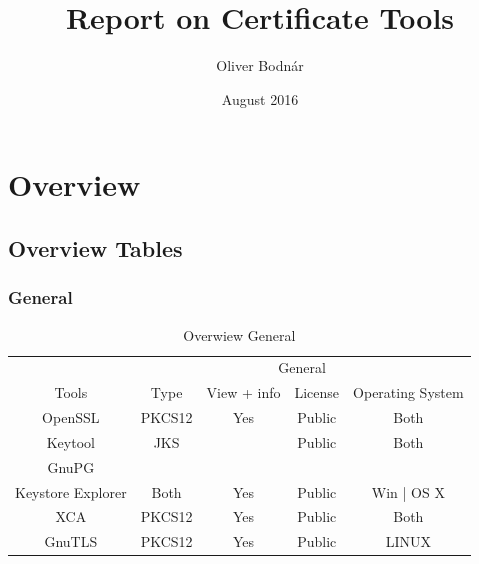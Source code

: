 \documentclass[10pt, a4paper]{report}
\title{Report on Certificate Tools}
\author{Oliver Bodnár}
\date{August 2016}
\begin{document}
\maketitle

\tableofcontents

\newpage

\part{Overview}

\chapter{Overview Tables}

\section{General}
\begin{table}[h!]
\centering
\caption{Overwiew General}
\label{my-label}
\begin{adjustbox}{max width=\textwidth}
\begin{tabular}{|c|c|c|c|c|}
\hline
                        & \multicolumn{4}{c|}{General}                                                                               \\ \cline{2-5} 
\multirow{-2}{*}{Tools} & Type   & View + info                                        & License & Operating System                   \\ \hline
OpenSSL                 & PKCS12 & \cellcolor[HTML]{34FF34}Yes                        & Public  & \cellcolor[HTML]{34FF34}Both       \\ \hline
Keytool                 & JKS    & \cellcolor[HTML]{34FF34}{\color[HTML]{000000} Yes} & Public  & \cellcolor[HTML]{34FF34}Both       \\ \hline
GnuPG                   &        &                                                    &         &                                    \\ \hline
Keystore Explorer       & Both   & \cellcolor[HTML]{34FF34}Yes                        & Public  & \cellcolor[HTML]{FFC702}Win | OS X \\ \hline
XCA                     & PKCS12 & \cellcolor[HTML]{34FF34}Yes                        & Public  & \cellcolor[HTML]{34FF34}Both       \\ \hline
GnuTLS                  & PKCS12 & \cellcolor[HTML]{34FF34}Yes                        & Public  & \cellcolor[HTML]{FFC702}LINUX       \\ \hline
\end{tabular}
\end{adjustbox}
\end{table}
\end{document}

